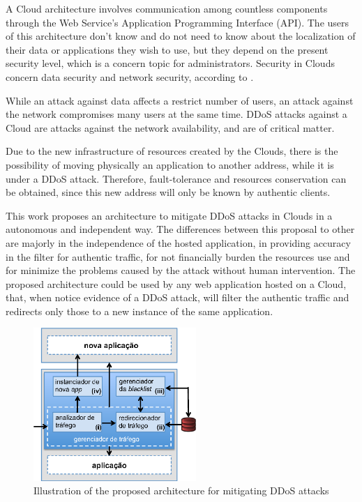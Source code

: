 
A Cloud architecture involves communication among countless components through the Web Service's Application Programming Interface (API). The users of this architecture don't know and do not need to know about the localization of their data or applications they wish to use, but they depend on the present security level, which is a concern topic for administrators. Security in Clouds concern data security and network security, according to \cite{Dhage:2011:IDS:1980022.1980076}. 

While an attack against data affects a restrict number of users, an attack against the network compromises many users at the same time. DDoS attacks against a Cloud are attacks against the network availability, and are of critical matter.

Due to the new infrastructure of resources created by the Clouds, there is the possibility of moving physically an application to another address, while it is under a DDoS attack. Therefore, fault-tolerance and resources conservation can be obtained, since this new address will only be known by authentic clients.

This work proposes an architecture to mitigate DDoS attacks in Clouds in a autonomous and independent way. The differences between this proposal to other are majorly in the independence of the hosted application, in providing accuracy in the filter for authentic traffic, for not financially burden the resources use and for minimize the problems caused by the attack without human intervention. The proposed architecture could be used by any web application hosted on a Cloud, that, when notice evidence of a DDoS attack, will filter the authentic traffic and redirects only those to a new instance of the same application.


\begin{figure}[h!]
\centering
\includegraphics[width=0.55\textwidth]{images/arq.eps}
\caption{Illustration of the proposed architecture for mitigating DDoS attacks}
\label{fig:arq}
\end{figure}

